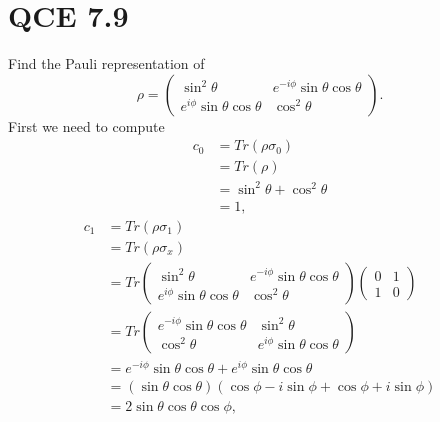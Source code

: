 \documentclass[10pt]{article}
\begin{document}
\section*{QCE 7.9}
Find the Pauli representation of 
\[
\rho = \begin{pmatrix}
\sin^2 \theta                             & e^{-i\phi} \sin \theta \cos \theta \\
e^{i\phi} \sin \theta \cos \theta & \cos^2 \theta
\end{pmatrix}.
\]
First we need to compute 
\begin{align*}
c_0 &= Tr(\rho \sigma_0) \\
      &= Tr(\rho) \\
      &= \sin^2 \theta + \cos^2 \theta \\
      &= 1,
\end{align*}
\begin{align*}
c_1 &= Tr(\rho \sigma_1) \\
      &= Tr(\rho \sigma_x) \\
      &= 
      Tr \begin{pmatrix}
          \sin^2 \theta                             & e^{-i\phi} \sin \theta \cos \theta \\
          e^{i\phi} \sin \theta \cos \theta & \cos^2 \theta
      \end{pmatrix}
      \begin{pmatrix}
      0 & 1 \\
      1 & 0
      \end{pmatrix} \\
      &= Tr
      \begin{pmatrix}
      e^{-i\phi} \sin \theta \cos \theta & \sin^2 \theta \\
      \cos^2 \theta & e^{i\phi} \sin \theta \cos \theta
      \end{pmatrix} \\
      &= 
      e^{-i\phi} \sin \theta \cos \theta + e^{i\phi} \sin \theta \cos \theta \\ 
      &=
      (\sin \theta \cos \theta)(\cos \phi -i \sin \phi + \cos \phi + i \sin \phi) \\
      &= 2 \sin \theta \cos \theta \cos \phi,
\end{align*}
\end{document}
